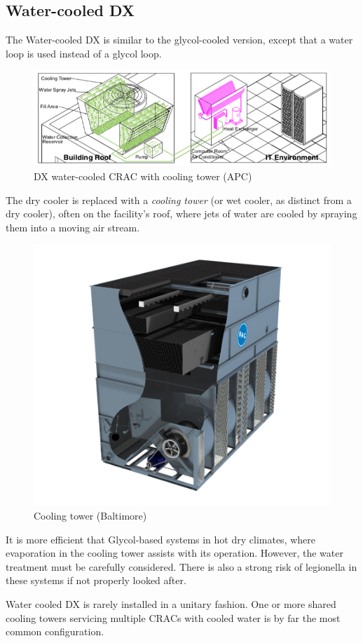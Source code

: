 \documentclass{pgnotes}
\begin{document}
\newpage
\subsection{Water-cooled DX}

The Water-cooled DX is similar to the glycol-cooled version, except that a water loop is used instead of a glycol loop.

\begin{figure}[hptb]
  \centering
  \includegraphics[width=1.0\linewidth]{crac_dx_water_schematic}
  \caption{DX water-cooled CRAC with cooling tower (APC)}
  \label{fig:crac-dx-water-schematic}
\end{figure}

The dry cooler is replaced with a \textit{cooling tower} (or wet cooler, as distinct from a dry cooler), often on the facility's roof, where jets of water are cooled by spraying them into a moving air stream.

\begin{figure}[htbp]
    \centering
    \includegraphics[width=0.4\linewidth]{cooling_tower_baltimore}
    \caption{Cooling tower (Baltimore)}
    \label{fig:cooling-tower-photo}
\end{figure}

It is more efficient that Glycol-based systems in hot dry climates, where evaporation in the cooling tower assists with its operation.
However, the water treatment must be carefully considered.
There is also a strong risk of legionella in these systems if not properly looked after.

Water cooled DX is rarely installed in a unitary fashion.
One or more shared cooling towers servicing multiple CRACs with cooled water is by far the most common configuration.
\end{document}

